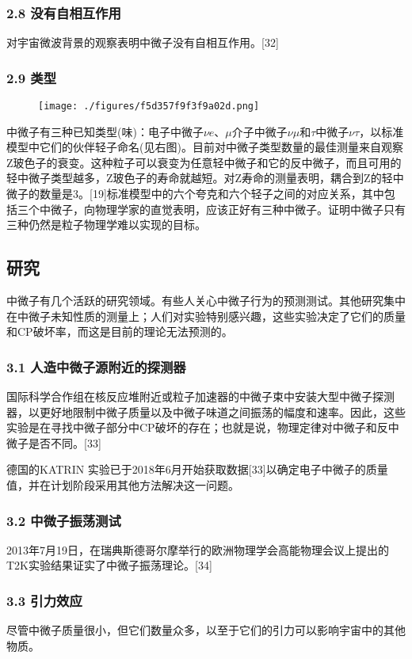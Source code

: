 \subsubsection{2.8 没有自相互作用}
对宇宙微波背景的观察表明中微子没有自相互作用。[32]

\subsubsection{2.9 类型}
\begin{figure}[ht]
\centering
\texttt{[image: ./figures/f5d357f9f3f9a02d.png]}
\caption\label{fig_ZWZ_2}
\end{figure}
中微子有三种已知类型(味)：电子中微子$\nu e$、$\mu$介子中微子$\nu\mu$和$\tau$中微子$\nu \tau$，以标准模型中它们的伙伴轻子命名(见右图)。目前对中微子类型数量的最佳测量来自观察Z玻色子的衰变。这种粒子可以衰变为任意轻中微子和它的反中微子，而且可用的轻中微子类型越多，Z玻色子的寿命就越短。对Z寿命的测量表明，耦合到Z的轻中微子的数量是3。[19]标准模型中的六个夸克和六个轻子之间的对应关系，其中包括三个中微子，向物理学家的直觉表明，应该正好有三种中微子。证明中微子只有三种仍然是粒子物理学难以实现的目标。

\subsection{研究}
中微子有几个活跃的研究领域。有些人关心中微子行为的预测测试。其他研究集中在中微子未知性质的测量上；人们对实验特别感兴趣，这些实验决定了它们的质量和CP破坏率，而这是目前的理论无法预测的。

\subsubsection{3.1 人造中微子源附近的探测器}
国际科学合作组在核反应堆附近或粒子加速器的中微子束中安装大型中微子探测器，以更好地限制中微子质量以及中微子味道之间振荡的幅度和速率。因此，这些实验是在寻找中微子部分中CP破坏的存在；也就是说，物理定律对中微子和反中微子是否不同。[33]

德国的KATRIN 实验已于2018年6月开始获取数据[33]以确定电子中微子的质量值，并在计划阶段采用其他方法解决这一问题。

\subsubsection{3.2 中微子振荡测试}
2013年7月19日，在瑞典斯德哥尔摩举行的欧洲物理学会高能物理会议上提出的T2K实验结果证实了中微子振荡理论。[34]

\subsubsection{3.3 引力效应}
尽管中微子质量很小，但它们数量众多，以至于它们的引力可以影响宇宙中的其他物质。


